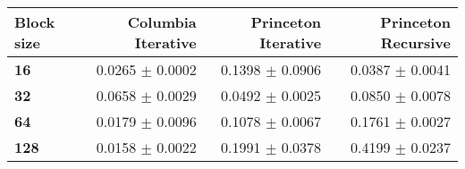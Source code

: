 \begin{tabular}{lrrr}\toprule
\textbf{Block size}  & \textbf{Columbia Iterative} & \textbf{Princeton Iterative} & \textbf{Princeton Recursive}\\\midrule
\textbf{16}  & 0.0265 $\pm$ 0.0002 & 0.1398 $\pm$ 0.0906 & 0.0387 $\pm$ 0.0041\\
\textbf{32}  & 0.0658 $\pm$ 0.0029 & 0.0492 $\pm$ 0.0025 & 0.0850 $\pm$ 0.0078\\
\textbf{64}  & 0.0179 $\pm$ 0.0096 & 0.1078 $\pm$ 0.0067 & 0.1761 $\pm$ 0.0027\\
\textbf{128} & 0.0158 $\pm$ 0.0022 & 0.1991 $\pm$ 0.0378 & 0.4199 $\pm$ 0.0237\\
\bottomrule
\end{tabular}
